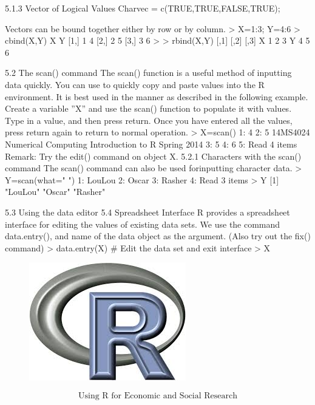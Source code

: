 \documentclass{beamer}
\begin{document}
\begin{frame}
5.1.3 Vector of Logical Values
Charvec = c(TRUE,TRUE,FALSE,TRUE);

Vectors can be bound together either by row or by column.
> X=1:3; Y=4:6
> cbind(X,Y)
X Y
[1,] 1 4
[2,] 2 5
[3,] 3 6
>
> rbind(X,Y)
[,1] [,2] [,3]
X 1 2 3
Y 4 5 6
\end{frame}
\begin{frame}
5.2 The scan() command
The scan() function is a useful method of inputting data quickly. You can use to quickly copy
and paste values into the R environment. It is best used in the manner as described in the
following example. Create a variable ”X” and use the scan() function to populate it with
values. Type in a value, and then press return. Once you have entered all the values, press
return again to return to normal operation.
> X=scan()
1: 4
2: 5
14MS4024 Numerical Computing Introduction to R Spring 2014
3: 5
4: 6
5:
Read 4 items
Remark: Try the edit() command on object X.
5.2.1 Characters with the scan() command
The scan() command can also be used forinputting character data.
> Y=scan(what=" ")
1: LouLou
2: Oscar
3: Rasher
4:
Read 3 items
> Y
[1] "LouLou" "Oscar" "Rasher"
\end{frame}
\begin{frame}
5.3 Using the data editor
5.4 Spreadsheet Interface
R provides a spreadsheet interface for editing the values of existing data sets. We use the
command data.entry(), and name of the data object as the argument. (Also try out the
fix() command)
> data.entry(X) # Edit the data set and exit interface
> X
\end{frame}
\begin{frame}
\begin{figure}
\centering
\includegraphics[width=0.7\linewidth]{Rlogo}
\end{figure}
\LARGE
\[ \mbox{Using R for Economic and Social Research} \]	



\end{frame}
\end{document}
